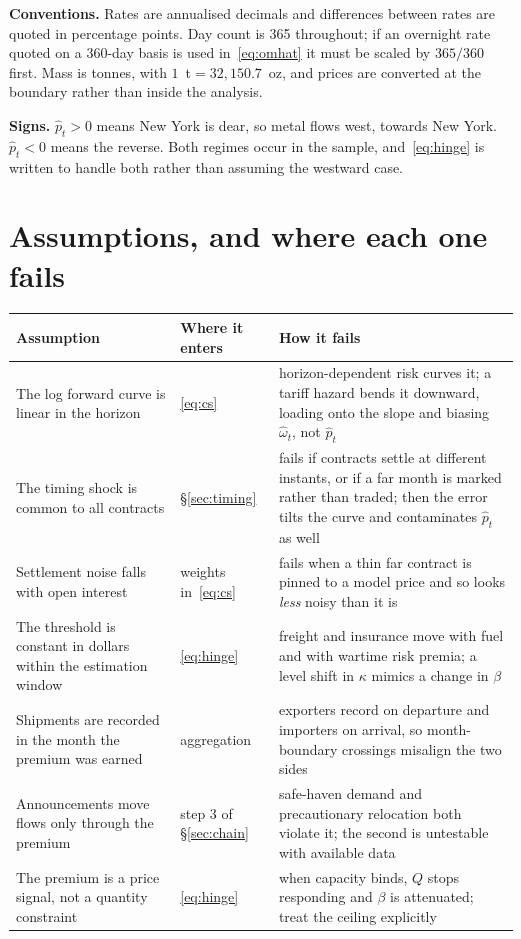 \documentclass[11pt,a4paper]{article}
\newcommand{\phat}{\widehat{p}_t}
\newcommand{\omhat}{\widehat{\omega}_t}
\begin{document}
\noindent\textbf{Conventions.} Rates are annualised decimals and differences
between rates are quoted in percentage points. Day count is 365 throughout; if
an overnight rate quoted on a 360-day basis is used in~\eqref{eq:omhat} it must
be scaled by $365/360$ first. Mass is tonnes, with $1$~t${}=32{,}150.7$~oz, and
prices are converted at the boundary rather than inside the analysis.

\noindent\textbf{Signs.} $\phat>0$ means New York is dear, so metal flows west,
towards New York. $\phat<0$ means the reverse. Both regimes occur in the
sample, and~\eqref{eq:hinge} is written to handle both rather than assuming the
westward case.

\section{Assumptions, and where each one fails}
\label{sec:assumptions}

\begin{center}
\begin{tabular}{@{}p{}p{}p{}@{}}
\toprule
\textbf{Assumption} & \textbf{Where it enters} & \textbf{How it fails} \\
\midrule
The log forward curve is linear in the horizon & \eqref{eq:cs} & horizon-dependent
risk curves it; a tariff hazard bends it downward, loading onto the slope and
biasing $\omhat$, not $\phat$ \\
The timing shock is common to all contracts & \S\ref{sec:timing} & fails if
contracts settle at different instants, or if a far month is marked rather than
traded; then the error tilts the curve and contaminates $\phat$ as well \\
Settlement noise falls with open interest & weights in~\eqref{eq:cs} & fails
when a thin far contract is pinned to a model price and so looks \emph{less}
noisy than it is \\
The threshold is constant in dollars within the estimation window &
\eqref{eq:hinge} & freight and insurance move with fuel and with wartime risk
premia; a level shift in $\kappa$ mimics a change in $\beta$ \\
Shipments are recorded in the month the premium was earned & aggregation &
exporters record on departure and importers on arrival, so month-boundary
crossings misalign the two sides \\
Announcements move flows only through the premium & step 3 of
\S\ref{sec:chain} & safe-haven demand and precautionary relocation both violate
it; the second is untestable with available data \\
The premium is a price signal, not a quantity constraint & \eqref{eq:hinge} &
when capacity binds, $Q$ stops responding and $\beta$ is attenuated; treat the
ceiling explicitly \\
\bottomrule
\end{tabular}
\end{center}
\end{document}
